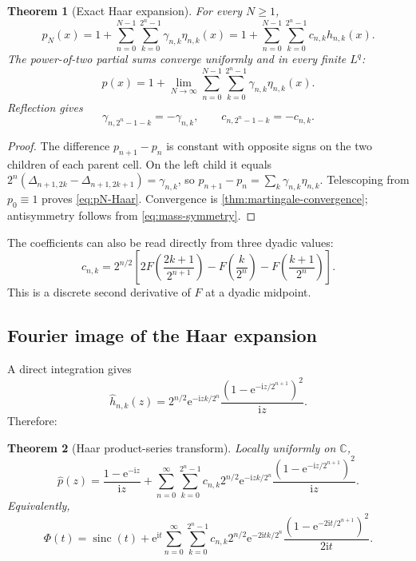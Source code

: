 \documentclass[11pt,oneside]{article}
\newtheorem{theorem}{Theorem}[section]
\theoremstyle{definition}
\theoremstyle{remark}
\newcommand{\C}{\mathbb C}
\newcommand{\sinc}{\operatorname{sinc}}
\newcommand{\e}{\mathrm e}
\newcommand{\ii}{\mathrm i}
\begin{document}
\begin{theorem}[Exact Haar expansion]
\label{thm:Haar-expansion}
For every $N\ge1$,
\begin{equation}\label{eq:pN-Haar}
 p_N(x)=1+\sum_{n=0}^{N-1}\sum_{k=0}^{2^n-1}
 \gamma_{n,k}\eta_{n,k}(x)
 =1+\sum_{n=0}^{N-1}\sum_{k=0}^{2^n-1}
 c_{n,k}h_{n,k}(x).
\end{equation}
The power-of-two partial sums converge uniformly and in every finite $L^q$:
\begin{equation}\label{eq:p-Haar-limit}
 p(x)=1+\lim_{N\to\infty}
 \sum_{n=0}^{N-1}\sum_{k=0}^{2^n-1}\gamma_{n,k}\eta_{n,k}(x).
\end{equation}
Reflection gives
\begin{equation}\label{eq:Haar-antisymmetry}
 \gamma_{n,2^n-1-k}=-\gamma_{n,k},
 \qquad
 c_{n,2^n-1-k}=-c_{n,k}.
\end{equation}
\end{theorem}

\begin{proof}
The difference $p_{n+1}-p_n$ is constant with opposite signs on the two
children of each parent cell.  On the left child it equals
$2^n(\Delta_{n+1,2k}-\Delta_{n+1,2k+1})=\gamma_{n,k}$,
so $p_{n+1}-p_n=\sum_k\gamma_{n,k}\eta_{n,k}$.  Telescoping from
$p_0\equiv1$ proves \eqref{eq:pN-Haar}.  Convergence is
\cref{thm:martingale-convergence}; antisymmetry follows from
\eqref{eq:mass-symmetry}.
\end{proof}

The coefficients can also be read directly from three dyadic values:
\begin{equation}\label{eq:c-three-values}
 c_{n,k}=2^{n/2}\left[
  2F\!\left(\frac{2k+1}{2^{n+1}}\right)
  -F\!\left(\frac{k}{2^n}\right)
  -F\!\left(\frac{k+1}{2^n}\right)
 \right].
\end{equation}
This is a discrete second derivative of $F$ at a dyadic midpoint.

\subsection{Fourier image of the Haar expansion}

A direct integration gives
\begin{equation}\label{eq:Haar-transform}
 \widehat h_{n,k}(z)
 =2^{n/2}\e^{-\ii zk/2^n}
 \frac{(1-\e^{-\ii z/2^{n+1}})^2}{\ii z}.
\end{equation}
Therefore:

\begin{theorem}[Haar product-series transform]
\label{thm:Haar-transform-series}
Locally uniformly on $\C$,
\begin{equation}\label{eq:p-Haar-transform}
 \widehat p(z)=\frac{1-\e^{-\ii z}}{\ii z}
 +\sum_{n=0}^\infty\sum_{k=0}^{2^n-1}
 c_{n,k}2^{n/2}\e^{-\ii zk/2^n}
 \frac{(1-\e^{-\ii z/2^{n+1}})^2}{\ii z}.
\end{equation}
Equivalently,
\begin{equation}\label{eq:Phi-Haar-transform}
 \Phi(t)=\sinc(t)
 +\e^{\ii t}\sum_{n=0}^\infty\sum_{k=0}^{2^n-1}
 c_{n,k}2^{n/2}\e^{-2\ii tk/2^n}
 \frac{(1-\e^{-2\ii t/2^{n+1}})^2}{2\ii t}.
\end{equation}
\end{theorem}
\end{document}
